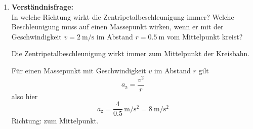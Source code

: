 \documentclass[11pt, a4paper]{article}
\begin{document}
\begin{enumerate}[label=\textbf{\arabic*.},itemsep=0.50cm]
    \item \textbf{Verständnisfrage:} \\
    In welche Richtung wirkt die Zentripetalbeschleunigung immer? Welche Beschleunigung muss auf einen Massepunkt wirken, wenn er mit der Geschwindigkeit $v = \SI{2}{\meter\per\second}$ im Abstand $r = \SI{0.5}{\meter}$ vom Mittelpunkt kreist?
    \begin{solutionbox}
        Die Zentripetalbeschleunigung wirkt immer zum Mittelpunkt der Kreisbahn.

        Für einen Massepunkt mit Geschwindigkeit $v$ im Abstand $r$ gilt
        \[
        a_{\mathrm{z}} = \frac{v^2}{r}
        \]
        also hier
        \[
        a_{\mathrm{z}} = \frac{4}{0.5}\,\si{\meter\per\second^2} = \SI{8}{\meter\per\second^2}
        \]
        Richtung: zum Mittelpunkt.
    \end{solutionbox}

\end{enumerate}

\vspace{1cm}
\end{document}
